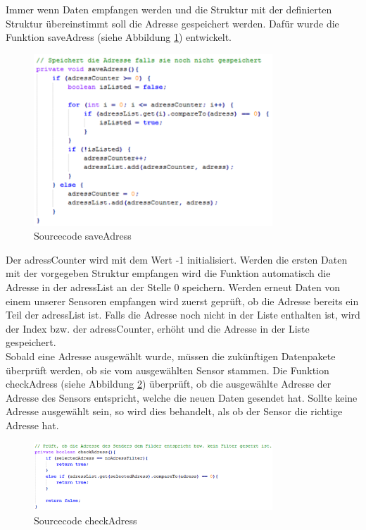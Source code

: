 Immer wenn Daten empfangen werden und die Struktur mit der definierten Struktur übereinstimmt soll die Adresse gespeichert werden. Dafür wurde die  Funktion saveAdress (siehe Abbildung \ref{app_saveAdress}) entwickelt. 

\begin{figure}[ht]
    \includegraphics[width=0.8\textwidth]{3Vorgehen/imag/app_saveAdress.png}
    \caption{Sourcecode saveAdress}
	\label{app_saveAdress} 
\end{figure}

Der adressCounter wird mit dem Wert -1 initialisiert. Werden die ersten Daten mit der vorgegeben Struktur empfangen wird die Funktion automatisch die Adresse in der adressList an der Stelle 0 speichern. Werden erneut Daten von einem unserer Sensoren empfangen wird zuerst geprüft, ob die Adresse bereits ein Teil der adressList ist. Falls die Adresse noch nicht in der Liste enthalten ist, wird der Index bzw. der adressCounter, erhöht und die Adresse in der Liste gespeichert.\\

Sobald eine Adresse ausgewählt wurde, müssen die zukünftigen Datenpakete überprüft werden, ob sie vom ausgewählten Sensor stammen. Die Funktion checkAdress (siehe Abbildung \ref{app_checkAdress}) überprüft, ob die ausgewählte Adresse der Adresse des Sensors entspricht, welche die neuen Daten gesendet hat. Sollte keine Adresse ausgewählt sein, so wird dies behandelt, als ob der Sensor die richtige Adresse hat.

\begin{figure}[ht]
    \includegraphics[width=0.8\textwidth]{3Vorgehen/imag/app_checkAdress.png}
    \caption{Sourcecode checkAdress}
	\label{app_checkAdress} 
\end{figure}

